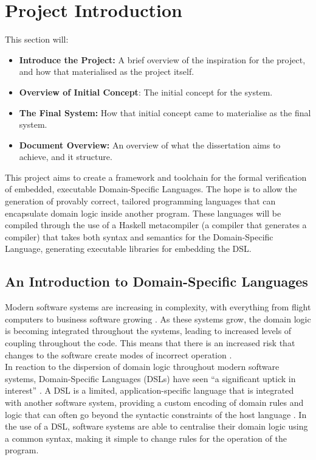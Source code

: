 
\chapter{Project Introduction} %
\label{cha:project_introduction}
This section will:
\begin{itemize}
    \item \textbf{Introduce the Project:} A brief overview of the inspiration for the project, and how that materialised as the project itself.
    \item \textbf{Overview of Initial Concept}: The initial concept for the system.
    \item \textbf{The Final System:} How that initial concept came to materialise as the final system.
    \item \textbf{Document Overview:} An overview of what the dissertation aims to achieve, and it structure. 
\end{itemize}

This project aims to create a framework and toolchain for the formal verification of embedded, executable Domain-Specific Languages.
The hope is to allow the generation of provably correct, tailored programming languages that can encapsulate domain logic inside another program.
These languages will be compiled through the use of a Haskell metacompiler (a compiler that generates a compiler) that takes both syntax and semantics for the Domain-Specific Language, generating executable libraries for embedding the DSL.

\section{An Introduction to Domain-Specific Languages} %
\label{sec:an_introduction_to_domain_specific_languages}
Modern software systems are increasing in complexity, with everything from flight computers to business software growing \citep{dvorak2009nasa}.
As these systems grow, the domain logic is becoming integrated throughout the systems, leading to increased levels of coupling throughout the code.
This means that there is an increased risk that changes to the software create modes of incorrect operation \citep{khawar2001developing}.\\

In reaction to the dispersion of domain logic throughout modern software systems, Domain-Specific Languages (DSLs) have seen ``a significant uptick in interest'' \citep{fowler2010domain}. 
A DSL is a limited, application-specific language that is integrated with another software system, providing a custom encoding of domain rules and logic that can often go beyond the syntactic constraints of the host language \citep{Mernik:2005:DDL:1118890.1118892}.
In the use of a DSL, software systems are able to centralise their domain logic using a common syntax, making it simple to change rules for the operation of the program.\\

